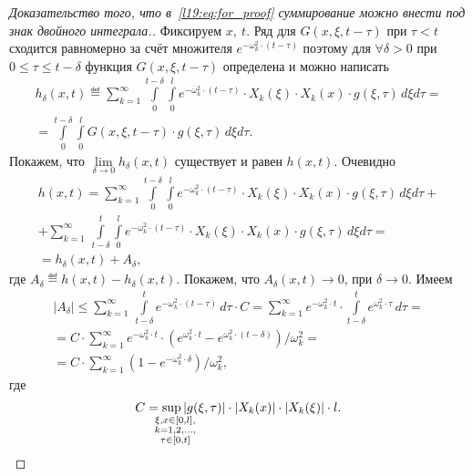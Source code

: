 \begin{proof}[Доказательство того, что в~\eqref{l19:eq:for_proof} суммирование можно внести под знак двойного интеграла.] Фиксируем $x,\ t$. Ряд для $G(x,\xi,t-\tau)$ при $\tau<t$ сходится равномерно за счёт множителя $\displaystyle e^{-\omega_k^2\cdot(t-\tau)}$ поэтому для $\forall\delta>0$ при $0\leqslant\tau\leqslant t-\delta$ функция $G(x,\xi,t-\tau)$ определена и можно написать
	\begin{multline*}
		h_{\delta}(x,t)\eqdef\sum\limits_{k=1}^{\infty}\int\limits_0^{t-\delta}\int\limits_0^l e^{-\omega_k^2\cdot(t-\tau)}\cdot X_k(\xi)\cdot X_k(x)\cdot g(\xi,\tau)\,d\xi d\tau=\\=\int\limits_0^{t-\delta}\int\limits_0^l G(x,\xi,t-\tau)\cdot g(\xi,\tau)\,d\xi d\tau.
	\end{multline*}
	Покажем, что $\displaystyle\lim\limits_{\delta\to0}h_{\delta}(x,t)$ существует и равен $h(x,t)$. Очевидно 
	\begin{multline}\label{l19:eq:34_}
		h(x,t)=	\sum\limits_{k=1}^{\infty}\int\limits_0^{t-\delta}\int\limits_0^l e^{-\omega_k^2\cdot(t-\tau)}\cdot X_k(\xi)\cdot X_k(x)\cdot g(\xi,\tau)\,d\xi d\tau+\\
		+\sum\limits_{k=1}^{\infty}\,\int\limits_{t-\delta}^t\int\limits_0^l e^{-\omega_k^2\cdot(t-\tau)}\cdot X_k(\xi)\cdot X_k(x)\cdot g(\xi,\tau)\,d\xi d\tau=\\=h_{\delta}(x,t)+A_{\delta},
	\end{multline}
	где $A_{\delta}\eqdef h(x,t)-h_{\delta}(x,t)$. Покажем, что $A_{\delta}(x,t)\to0$, при $\delta\to0$. Имеем
	\begin{multline}
		\label{l19:eq:35_}
		|A_{\delta}|\leqslant\sum\limits_{k=1}^{\infty}\,\int\limits_{t-\delta}^t e^{-\omega_k^2\cdot(t-\tau)}\,d\tau\cdot C=\sum\limits_{k=1}^{\infty}e^{-\omega_k^2\cdot t}\cdot\int\limits_{t-\delta}^t e^{\omega_k^2\cdot\tau}\,d\tau=\\
		=C\cdot\sum\limits_{k=1}^{\infty}e^{-\omega_k^2\cdot t}\cdot\left(e^{\omega_k^2\cdot t}-e^{\omega_k^2\cdot(t-\delta)}\right)\Big/\omega_k^2=\\=C\cdot\sum\limits_{k=1}^{\infty}\left(1-e^{-\omega_k^2\cdot\delta}\right)\Big/\omega_k^2,
	\end{multline}	
	где 
	\begin{equation*}
		C=\sup\limits_{\lefteqn{\scriptstyle\substack{\xi,x\in[0,l],\\ k=1,2,\ldots,\\ \tau\in[0,t]}}}|g(\xi,\tau)|\cdot|X_k(x)|\cdot|X_k(\xi)|\cdot l.
	\end{equation*}

\end{proof}
